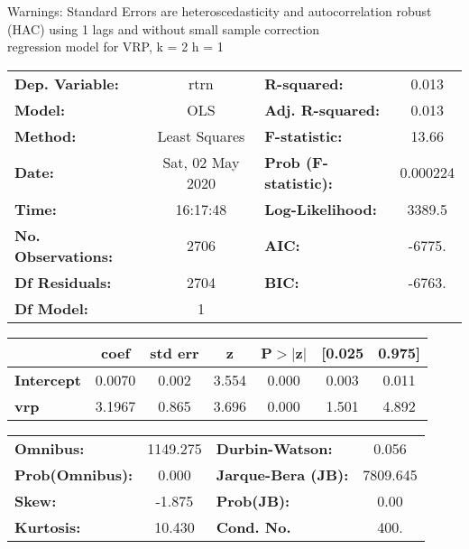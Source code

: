 Warnings: \newline
 [1] Standard Errors are heteroscedasticity and autocorrelation robust (HAC) using 1 lags and without small sample correction\\ 

regression model for VRP, k = 2 h = 1\begin{center}
\begin{tabular}{lclc}
\toprule
\textbf{Dep. Variable:}    &       rtrn       & \textbf{  R-squared:         } &     0.013   \\
\textbf{Model:}            &       OLS        & \textbf{  Adj. R-squared:    } &     0.013   \\
\textbf{Method:}           &  Least Squares   & \textbf{  F-statistic:       } &     13.66   \\
\textbf{Date:}             & Sat, 02 May 2020 & \textbf{  Prob (F-statistic):} &  0.000224   \\
\textbf{Time:}             &     16:17:48     & \textbf{  Log-Likelihood:    } &    3389.5   \\
\textbf{No. Observations:} &        2706      & \textbf{  AIC:               } &    -6775.   \\
\textbf{Df Residuals:}     &        2704      & \textbf{  BIC:               } &    -6763.   \\
\textbf{Df Model:}         &           1      & \textbf{                     } &             \\
\bottomrule
\end{tabular}
\begin{tabular}{lcccccc}
                   & \textbf{coef} & \textbf{std err} & \textbf{z} & \textbf{P$> |$z$|$} & \textbf{[0.025} & \textbf{0.975]}  \\
\midrule
\textbf{Intercept} &       0.0070  &        0.002     &     3.554  &         0.000        &        0.003    &        0.011     \\
\textbf{vrp}       &       3.1967  &        0.865     &     3.696  &         0.000        &        1.501    &        4.892     \\
\bottomrule
\end{tabular}
\begin{tabular}{lclc}
\textbf{Omnibus:}       & 1149.275 & \textbf{  Durbin-Watson:     } &    0.056  \\
\textbf{Prob(Omnibus):} &   0.000  & \textbf{  Jarque-Bera (JB):  } & 7809.645  \\
\textbf{Skew:}          &  -1.875  & \textbf{  Prob(JB):          } &     0.00  \\
\textbf{Kurtosis:}      &  10.430  & \textbf{  Cond. No.          } &     400.  \\
\bottomrule
\end{tabular}
\end{center}

